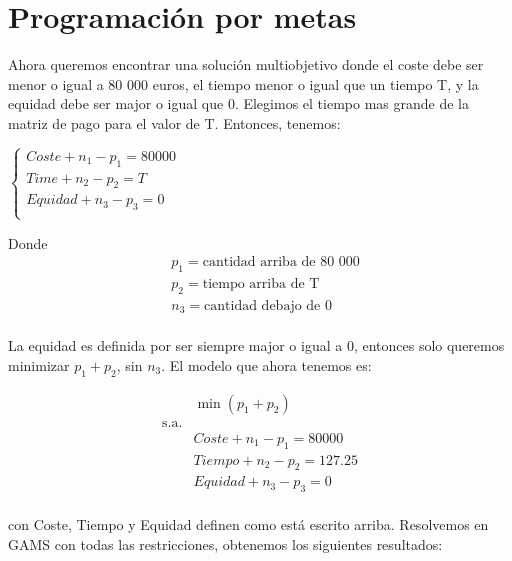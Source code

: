 \documentclass[]{article}
\begin{document}
\section{Programación por metas}
Ahora queremos encontrar una solución multiobjetivo donde el coste debe ser menor o igual a 80 000 euros, el tiempo menor o igual que un tiempo T, y la equidad debe ser major o igual que 0. Elegimos el tiempo mas grande de la matriz de pago para el valor de T. Entonces, tenemos:\\

\begin{center}
$
\begin{cases}
Coste + n_1 - p_1 = 80 000 \\
Time + n_2 - p_2 = T \\
Equidad+ n_3 - p_3 = 0\\
\end{cases}
$
\end{center}

\noindent Donde 
\begin{align*}
& p_1 = \text{cantidad arriba de 80 000} \\
& p_2 = \text{tiempo arriba de T} \\
& n_3 = \text{cantidad debajo de 0} \\
\end{align*}

\noindent La equidad es definida por ser siempre major o igual a 0, entonces solo queremos minimizar $p_1 + p_2$, sin $n_3$. El modelo que ahora tenemos es:

\begin{align*}
&\min (p_1+p_2) \\
\text{s.a.} \\
& Coste + n_1 - p_1 = 80 000 \\
&Tiempo + n_2 - p_2 = 127.25 \\
&Equidad+ n_3 - p_3 = 0\\
\end{align*}

\noindent con Coste, Tiempo y Equidad definen como está escrito arriba. Resolvemos en GAMS con todas las restricciones, obtenemos los siguientes resultados:
\end{document}
